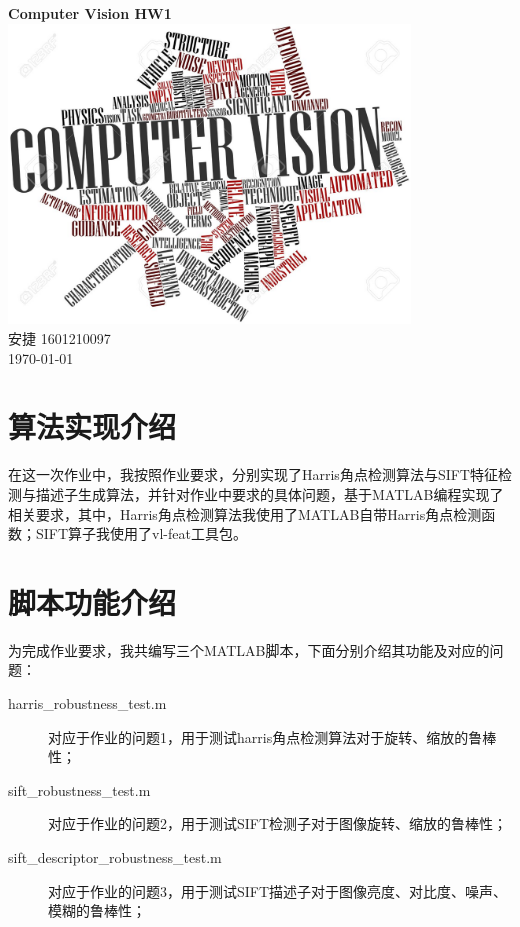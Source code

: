 \documentclass[a4paper, UTF8]{ctexrep}
\begin{document}
	\begin{titlepage}
		\centering
		\vspace{6cm}
		\LARGE{\textbf{Computer Vision HW1}}\\
		\vspace{4cm}
		\includegraphics[width=0.8\textwidth]{cv.jpg}\\
		\vspace{5cm}
		\normalsize{安捷 1601210097}\\
		\normalsize{\today}
	\end{titlepage}
  \section{算法实现介绍}
    在这一次作业中，我按照作业要求，分别实现了Harris角点检测算法与SIFT特征检测与描述子生成算法，并针对作业中要求的具体问题，基于MATLAB编程实现了相关要求，其中，Harris角点检测算法我使用了MATLAB自带Harris角点检测函数；SIFT算子我使用了vl-feat工具包。
  \section{脚本功能介绍}
    为完成作业要求，我共编写三个MATLAB脚本，下面分别介绍其功能及对应的问题：
    \begin{description}
      \item[harris\_robustness\_test.m] 对应于作业的问题1，用于测试harris角点检测算法对于旋转、缩放的鲁棒性；
      \item[sift\_robustness\_test.m] 对应于作业的问题2，用于测试SIFT检测子对于图像旋转、缩放的鲁棒性；
      \item[sift\_descriptor\_robustness\_test.m] 对应于作业的问题3，用于测试SIFT描述子对于图像亮度、对比度、噪声、模糊的鲁棒性；
    \end{description}
\end{document}
